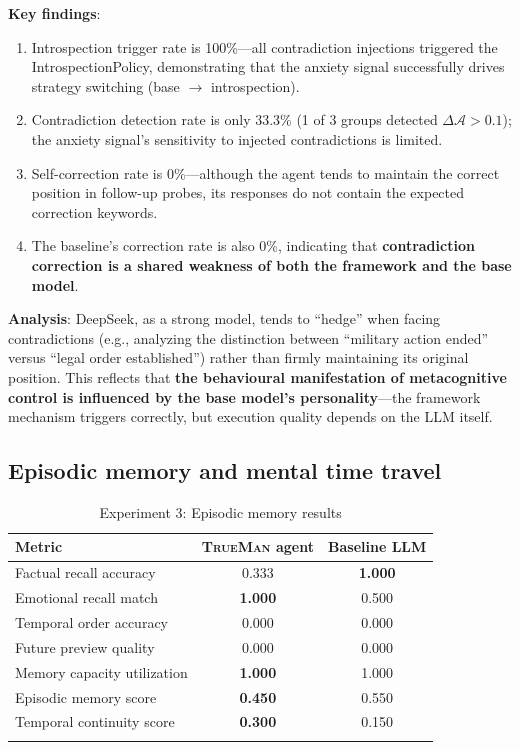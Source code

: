 \documentclass[pdflatex,sn-mathphys-num]{sn-jnl}
\newcommand{\TrueMan}{\textsc{TrueMan}}
\newcommand{\anxiety}{\mathcal{A}}
\theoremstyle{thmstyleone}%
\theoremstyle{thmstyletwo}%
\theoremstyle{thmstylethree}%
\begin{document}
\textbf{Key findings}:
\begin{enumerate}[leftmargin=2em]
    \item Introspection trigger rate is 100\%---all contradiction injections triggered the IntrospectionPolicy, demonstrating that the anxiety signal successfully drives strategy switching (base $\rightarrow$ introspection).
    \item Contradiction detection rate is only 33.3\% (1 of 3 groups detected $\Delta\anxiety > 0.1$); the anxiety signal's sensitivity to injected contradictions is limited.
    \item Self-correction rate is 0\%---although the agent tends to maintain the correct position in follow-up probes, its responses do not contain the expected correction keywords.
    \item The baseline's correction rate is also 0\%, indicating that \textbf{contradiction correction is a shared weakness of both the framework and the base model}.
\end{enumerate}

\textbf{Analysis}: DeepSeek, as a strong model, tends to ``hedge'' when facing contradictions (e.g., analyzing the distinction between ``military action ended'' versus ``legal order established'') rather than firmly maintaining its original position. This reflects that \textbf{the behavioural manifestation of metacognitive control is influenced by the base model's personality}---the framework mechanism triggers correctly, but execution quality depends on the LLM itself.

\subsection{Episodic memory and mental time travel}

\begin{table}[h]
\caption{Experiment 3: Episodic memory results}\label{tab:exp3_results}%
\begin{tabular}{@{}lcc@{}}
\toprule
Metric & \TrueMan{} agent & Baseline LLM \\
\midrule
Factual recall accuracy & 0.333 & \textbf{1.000} \\
Emotional recall match & \textbf{1.000} & 0.500\footnotemark[1] \\
Temporal order accuracy & 0.000 & 0.000 \\
Future preview quality & 0.000 & 0.000 \\
Memory capacity utilization & \textbf{1.000} & 1.000\footnotemark[2] \\
\midrule
Episodic memory score & \textbf{0.450} & 0.550 \\
Temporal continuity score & \textbf{0.300} & 0.150 \\
\botrule
\end{tabular}
\end{table}
\end{document}
